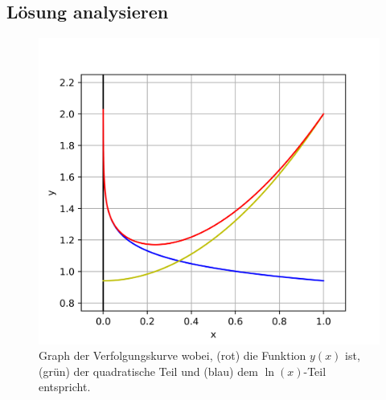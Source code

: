 \subsection{Lösung analysieren
	\label{lambertw:subsection:LoesAnalys}}

\begin{figure}
	\centering
	\includegraphics{papers/lambertw/Bilder/VerfolgungskurveBsp.png}
	\caption[Graph der Verfolgungskurve]{Graph der Verfolgungskurve wobei, ({\color{red}rot}) die Funktion \ensuremath{y(x)} ist, ({\color{darkgreen}grün}) der quadratische Teil und ({\color{blue}blau}) dem \ensuremath{\operatorname{ln}(x)}-Teil entspricht.
	\label{lambertw:BildFunkLoes}
	}
\end{figure}

